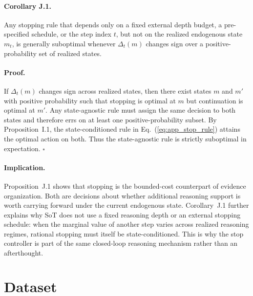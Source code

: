 \paragraph{Corollary J.1.}
Any stopping rule that depends only on a fixed external depth budget, a pre-specified schedule, or the step index \(t\), but not on the realized endogenous state \(m_t\), is generally suboptimal whenever \(\Delta_t(m)\) changes sign over a positive-probability set of realized states.

\paragraph{Proof.}
If \(\Delta_t(m)\) changes sign across realized states, then there exist states \(m\) and \(m'\) with positive probability such that stopping is optimal at \(m\) but continuation is optimal at \(m'\).
Any state-agnostic rule must assign the same decision to both states and therefore errs on at least one positive-probability subset.
By Proposition~I.1, the state-conditioned rule in Eq.~(\ref{eq:app_stop_rule}) attains the optimal action on both.
Thus the state-agnostic rule is strictly suboptimal in expectation.
\hfill\(\square\)

\paragraph{Implication.}
Proposition~J.1 shows that stopping is the bounded-cost counterpart of evidence organization.
Both are decisions about whether additional reasoning support is worth carrying forward under the current endogenous state.
Corollary~J.1 further explains why SoT does not use a fixed reasoning depth or an external stopping schedule: when the marginal value of another step varies across realized reasoning regimes, rational stopping must itself be state-conditioned.
This is why the stop controller is part of the same closed-loop reasoning mechanism rather than an afterthought.

\clearpage
{}
\vspace{-4mm}
\section{Dataset}
\label{app:dataset_setup}
\vspace{-2mm}


